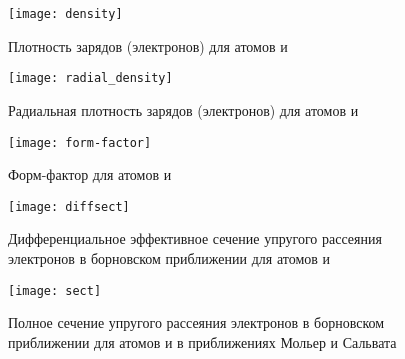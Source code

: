   \begin{figure}[h!]
    \centering
    \texttt{[image: density]}
    \caption{Плотность зарядов (электронов) для атомов
      \fiat и \seat}
    \label{fig:density}
  \end{figure}

  \begin{figure}[h!]
    \centering
    \texttt{[image: radial\_density]}
    \caption{Радиальная плотность зарядов (электронов)
      для атомов \fiat и \seat}
    \label{fig:radial}
  \end{figure}

  \begin{figure}[h!]
    \centering
    \texttt{[image: form-factor]}
    \caption{Форм-фактор для атомов \fiat и \seat}
    \label{fig:factor}
  \end{figure}

  \begin{figure}[h!]
    \centering
    \texttt{[image: diffsect]}
    \caption{Дифференциальное эффективное сечение упругого
      рассеяния электронов в борновском приближении для атомов
      \fiat и \seat}
    \label{fig:diff}
  \end{figure}

  \begin{figure}[h!]
    \centering
    \texttt{[image: sect]}
    \caption{Полное сечение упругого рассеяния электронов в
      борновском приближении для атомов \fiat и \seat в
      приближениях Мольер и Сальвата}
    \label{fig:sect}
  \end{figure}


